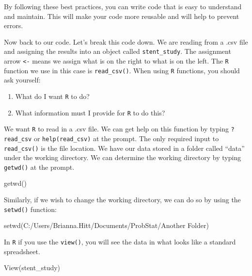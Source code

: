 \documentclass[
  letterpaper,
  DIV=11,
  numbers=noendperiod]{scrreprt}
\newenvironment{Shaded}{\begin{snugshade}}{\end{snugshade}}
\newcommand{\FunctionTok}[1]{\textcolor[rgb]{0.28,0.35,0.67}{#1}}
\newcommand{\NormalTok}[1]{\textcolor[rgb]{0.00,0.23,0.31}{#1}}
\newcommand{\StringTok}[1]{\textcolor[rgb]{0.13,0.47,0.30}{#1}}
\begin{document}
By following these best practices, you can write code that is easy to
understand and maintain. This will make your code more reusable and will
help to prevent errors.

Now back to our code. Let's break this code down. We are reading from a
.csv file and assigning the results into an object called
\texttt{stent\_study}. The assignment arrow \texttt{\textless{}-} means
we assign what is on the right to what is on the left. The \texttt{R}
function we use in this case is \texttt{read\_csv()}. When using
\texttt{R} functions, you should ask yourself:

\begin{enumerate}
\def\labelenumi{\arabic{enumi}.}
\item
  What do I want \texttt{R} to do?
\item
  What information must I provide for \texttt{R} to do this?
\end{enumerate}

We want \texttt{R} to read in a .csv file. We can get help on this
function by typing \texttt{?read\_csv} or \texttt{help(read\_csv)} at
the prompt. The only required input to \texttt{read\_csv()} is the file
location. We have our data stored in a folder called ``data'' under the
working directory. We can determine the working directory by typing
\texttt{getwd()} at the prompt.

\begin{Shaded}
\begin{Highlighting}[]
\FunctionTok{getwd}\NormalTok{()}
\end{Highlighting}
\end{Shaded}

Similarly, if we wish to change the working directory, we can do so by
using the \texttt{setwd()} function:

\begin{Shaded}
\begin{Highlighting}[]
\FunctionTok{setwd}\NormalTok{(}\StringTok{\textquotesingle{}C:/Users/Brianna.Hitt/Documents/ProbStat/Another Folder\textquotesingle{}}\NormalTok{)}
\end{Highlighting}
\end{Shaded}

In \texttt{R} if you use the \texttt{view()}, you will see the data in
what looks like a standard spreadsheet.

\begin{Shaded}
\begin{Highlighting}[]
\FunctionTok{View}\NormalTok{(stent\_study)}
\end{Highlighting}
\end{Shaded}
\end{document}
